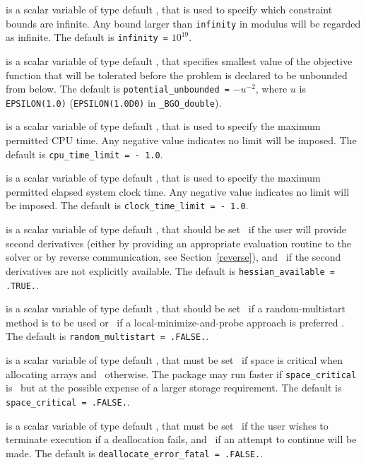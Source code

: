 \documentclass{galahad}
\newcommand{\packagename}{BGO}
\newcommand{\fullpackagename}{\libraryname\_\packagename}
\begin{document}
\begin{description}
 is a scalar variable of type default \realdp, that is used to
specify which constraint bounds are infinite.
Any bound larger than {\tt infinity} in modulus will be regarded as infinite.
The default is {\tt infinity =} $10^{19}$.

  is a scalar variable of type default
\realdp, that specifies smallest
value of the objective function that will be tolerated before the problem
is declared to be unbounded from below.
The default is {\tt potential\_u\-nbounded =} $-u^{-2}$,
where $u$ is {\tt EPSILON(1.0)} ({\tt EPSILON(1.0D0)} in
{\tt \fullpackagename\_double}).

 is a scalar variable of type default \realdp,
that is used to specify the maximum permitted CPU time. Any negative
value indicates no limit will be imposed. The default is
{\tt cpu\_time\_limit = - 1.0}.

 is a scalar variable of type default \realdp,
that is used to specify the maximum permitted elapsed system clock time.
Any negative value indicates no limit will be imposed. The default is
{\tt clock\_time\_limit = - 1.0}.

is a scalar variable of type default \logical,
that should be set \true\ if the user will provide second derivatives
(either by providing an appropriate evaluation routine to the solver
or by reverse communication, see Section~\ref{reverse}), and
\false\ if the second derivatives are not explicitly available.
The default is {\tt hessian\_available = .TRUE.}.

is a scalar variable of type default \logical,
that should be set \true\ if a random-multistart method is to be used or
\false\ if a local-minimize-and-probe approach is preferred .
The default is {\tt random\_\-multistart = .FALSE.}.

 is a scalar variable of type default \logical,
that must be set \true\ if space is critical when allocating arrays
and  \false\ otherwise. The package may run faster if
{\tt space\_critical} is \false\ but at the possible expense of a larger
storage requirement. The default is {\tt space\_critical = .FALSE.}.

 is a scalar variable of type default \logical,
that must be set \true\ if the user wishes to terminate execution if
a deallocation  fails, and \false\ if an attempt to continue
will be made. The default is {\tt deallocate\_error\_fatal = .FALSE.}.


\end{description}
\end{document}
